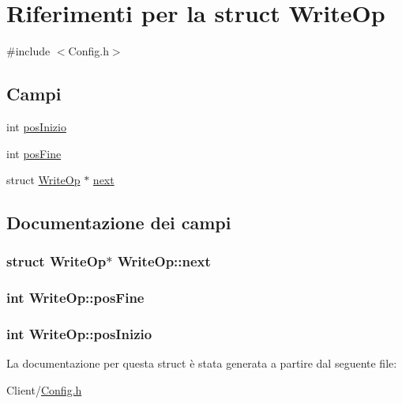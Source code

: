 \hypertarget{structWriteOp}{\section{Riferimenti per la struct Write\+Op}
\label{structWriteOp}
}


{\ttfamily \#include $<$Config.\+h$>$}

\subsection*{Campi}
\begin{DoxyCompactItemize}
\item 
int \hyperlink{structWriteOp_a415a6d3f0ad48e8f3e75f28d3fddd8c1}{pos\+Inizio}
\item 
int \hyperlink{structWriteOp_a1e30be6ad0c2d27427c106424d3fa94b}{pos\+Fine}
\item 
struct \hyperlink{structWriteOp}{Write\+Op} $\ast$ \hyperlink{structWriteOp_ab10157ced397c43b41d1e77a6372a43c}{next}
\end{DoxyCompactItemize}


\subsection{Documentazione dei campi}
\hypertarget{structWriteOp_ab10157ced397c43b41d1e77a6372a43c}{
\subsubsection[{next}]{\setlength{\rightskip}{0pt plus 5cm}struct {\bf Write\+Op}$\ast$ Write\+Op\+::next}}\label{structWriteOp_ab10157ced397c43b41d1e77a6372a43c}
\hypertarget{structWriteOp_a1e30be6ad0c2d27427c106424d3fa94b}{
\subsubsection[{pos\+Fine}]{\setlength{\rightskip}{0pt plus 5cm}int Write\+Op\+::pos\+Fine}}\label{structWriteOp_a1e30be6ad0c2d27427c106424d3fa94b}
\hypertarget{structWriteOp_a415a6d3f0ad48e8f3e75f28d3fddd8c1}{
\subsubsection[{pos\+Inizio}]{\setlength{\rightskip}{0pt plus 5cm}int Write\+Op\+::pos\+Inizio}}\label{structWriteOp_a415a6d3f0ad48e8f3e75f28d3fddd8c1}


La documentazione per questa struct è stata generata a partire dal seguente file\+:\begin{DoxyCompactItemize}
\item 
Client/\hyperlink{Client_2Config_8h}{Config.\+h}\end{DoxyCompactItemize}
